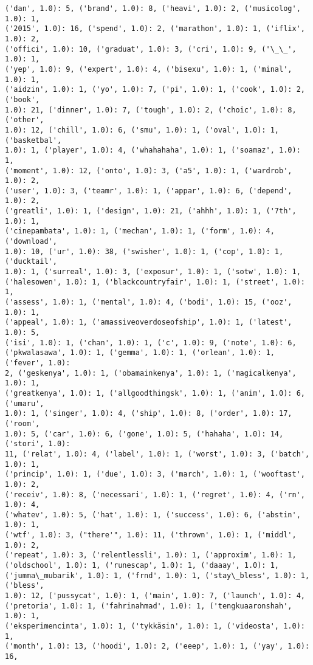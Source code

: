 \documentclass[11pt]{article}
\begin{document}
\begin{Verbatim}[commandchars=\\\{\}]
('dan', 1.0): 5, ('brand', 1.0): 8, ('heavi', 1.0): 2, ('musicolog', 1.0): 1,
('2015', 1.0): 16, ('spend', 1.0): 2, ('marathon', 1.0): 1, ('iflix', 1.0): 2,
('offici', 1.0): 10, ('graduat', 1.0): 3, ('cri', 1.0): 9, ('\_\_', 1.0): 1,
('yep', 1.0): 9, ('expert', 1.0): 4, ('bisexu', 1.0): 1, ('minal', 1.0): 1,
('aidzin', 1.0): 1, ('yo', 1.0): 7, ('pi', 1.0): 1, ('cook', 1.0): 2, ('book',
1.0): 21, ('dinner', 1.0): 7, ('tough', 1.0): 2, ('choic', 1.0): 8, ('other',
1.0): 12, ('chill', 1.0): 6, ('smu', 1.0): 1, ('oval', 1.0): 1, ('basketbal',
1.0): 1, ('player', 1.0): 4, ('whahahaha', 1.0): 1, ('soamaz', 1.0): 1,
('moment', 1.0): 12, ('onto', 1.0): 3, ('a5', 1.0): 1, ('wardrob', 1.0): 2,
('user', 1.0): 3, ('teamr', 1.0): 1, ('appar', 1.0): 6, ('depend', 1.0): 2,
('greatli', 1.0): 1, ('design', 1.0): 21, ('ahhh', 1.0): 1, ('7th', 1.0): 1,
('cinepambata', 1.0): 1, ('mechan', 1.0): 1, ('form', 1.0): 4, ('download',
1.0): 10, ('ur', 1.0): 38, ('swisher', 1.0): 1, ('cop', 1.0): 1, ('ducktail',
1.0): 1, ('surreal', 1.0): 3, ('exposur', 1.0): 1, ('sotw', 1.0): 1,
('halesowen', 1.0): 1, ('blackcountryfair', 1.0): 1, ('street', 1.0): 1,
('assess', 1.0): 1, ('mental', 1.0): 4, ('bodi', 1.0): 15, ('ooz', 1.0): 1,
('appeal', 1.0): 1, ('amassiveoverdoseofship', 1.0): 1, ('latest', 1.0): 5,
('isi', 1.0): 1, ('chan', 1.0): 1, ('c', 1.0): 9, ('note', 1.0): 6,
('pkwalasawa', 1.0): 1, ('gemma', 1.0): 1, ('orlean', 1.0): 1, ('fever', 1.0):
2, ('geskenya', 1.0): 1, ('obamainkenya', 1.0): 1, ('magicalkenya', 1.0): 1,
('greatkenya', 1.0): 1, ('allgoodthingsk', 1.0): 1, ('anim', 1.0): 6, ('umaru',
1.0): 1, ('singer', 1.0): 4, ('ship', 1.0): 8, ('order', 1.0): 17, ('room',
1.0): 5, ('car', 1.0): 6, ('gone', 1.0): 5, ('hahaha', 1.0): 14, ('stori', 1.0):
11, ('relat', 1.0): 4, ('label', 1.0): 1, ('worst', 1.0): 3, ('batch', 1.0): 1,
('princip', 1.0): 1, ('due', 1.0): 3, ('march', 1.0): 1, ('wooftast', 1.0): 2,
('receiv', 1.0): 8, ('necessari', 1.0): 1, ('regret', 1.0): 4, ('rn', 1.0): 4,
('whatev', 1.0): 5, ('hat', 1.0): 1, ('success', 1.0): 6, ('abstin', 1.0): 1,
('wtf', 1.0): 3, ("there'", 1.0): 11, ('thrown', 1.0): 1, ('middl', 1.0): 2,
('repeat', 1.0): 3, ('relentlessli', 1.0): 1, ('approxim', 1.0): 1,
('oldschool', 1.0): 1, ('runescap', 1.0): 1, ('daaay', 1.0): 1,
('jumma\_mubarik', 1.0): 1, ('frnd', 1.0): 1, ('stay\_bless', 1.0): 1, ('bless',
1.0): 12, ('pussycat', 1.0): 1, ('main', 1.0): 7, ('launch', 1.0): 4,
('pretoria', 1.0): 1, ('fahrinahmad', 1.0): 1, ('tengkuaaronshah', 1.0): 1,
('eksperimencinta', 1.0): 1, ('tykkäsin', 1.0): 1, ('videosta', 1.0): 1,
('month', 1.0): 13, ('hoodi', 1.0): 2, ('eeep', 1.0): 1, ('yay', 1.0): 16,

\end{Verbatim}
\end{document}
